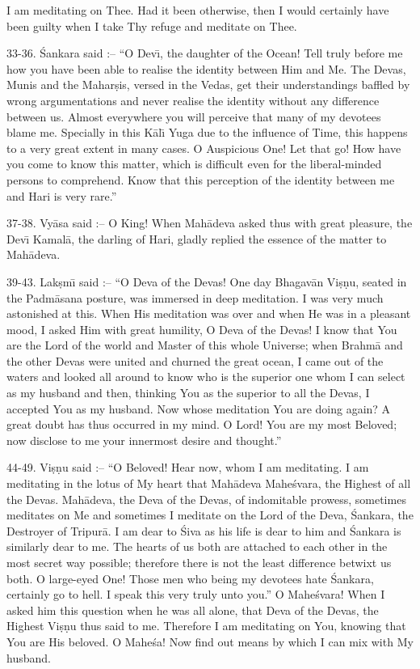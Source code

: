 I am meditating on Thee. Had it been otherwise, then I would certainly have been guilty when I take Thy refuge and meditate on Thee.

33-36. \'Sankara said :-- ``O Dev\={\i}, the daughter of the Ocean! Tell truly before me how you have been able to realise the identity between Him and Me. The Devas, Munis and the Mahar\d{s}is, versed in the Vedas, get their understandings baffled by wrong argumentations and never realise the identity without any difference between us. Almost everywhere you will perceive that many of my devotees blame me. Specially in this K\=al\={\i} Yuga due to the influence of Time, this happens to a very great extent in many cases. O Auspicious One! Let that go! How have you come to know this matter, which is difficult even for the liberal-minded persons to comprehend. Know that this perception of the identity between me and Hari is very rare.''

37-38. Vy\=asa said :-- O King! When Mah\=adeva asked thus with great pleasure, the Dev\={\i} Kamal\=a, the darling of Hari, gladly replied the essence of the matter to Mah\=adeva.

39-43. Lak\d{s}m\={\i} said :-- ``O Deva of the Devas! One day Bhagav\=an Vi\d{s}\d{n}u, seated in the Padm\=asana posture, was immersed in deep meditation. I was very much astonished at this. When His meditation was over and when He was in a pleasant mood, I asked Him with great humility, O Deva of the Devas! I know that You are the Lord of the world and Master of this whole Universe; when Brahm\=a and the other Devas were united and churned the great ocean, I came out of the waters and looked all around to know who is the superior one whom I can select as my husband and then, thinking You as the superior to all the Devas, I accepted You as my husband. Now whose meditation You are doing again? A great doubt has thus occurred in my mind. O Lord! You are my most Beloved; now disclose to me your innermost desire and thought.''

44-49. Vi\d{s}\d{n}u said :-- ``O Beloved! Hear now, whom I am meditating. I am meditating in the lotus of My heart that Mah\=adeva Mahe\'svara, the Highest of all the Devas. Mah\=adeva, the Deva of the Devas, of indomitable prowess, sometimes meditates on Me and sometimes I meditate on the Lord of the Deva, \'Sankara, the Destroyer of Tripur\=a. I am dear to \'Siva as his life is dear to him and \'Sankara is similarly dear to me. The hearts of us both are attached to each other in the most secret way possible; therefore there is not the least difference betwixt us both. O large-eyed One! Those men who being my devotees hate \'Sankara, certainly go to hell. I speak this very truly unto you.'' O Mahe\'svara! When I asked him this question when he was all alone, that Deva of the Devas, the Highest Vi\d{s}\d{n}u thus said to me. Therefore I am meditating on You, knowing that You are His beloved. O Mahe\'sa! Now find out means by which I can mix with My husband.


